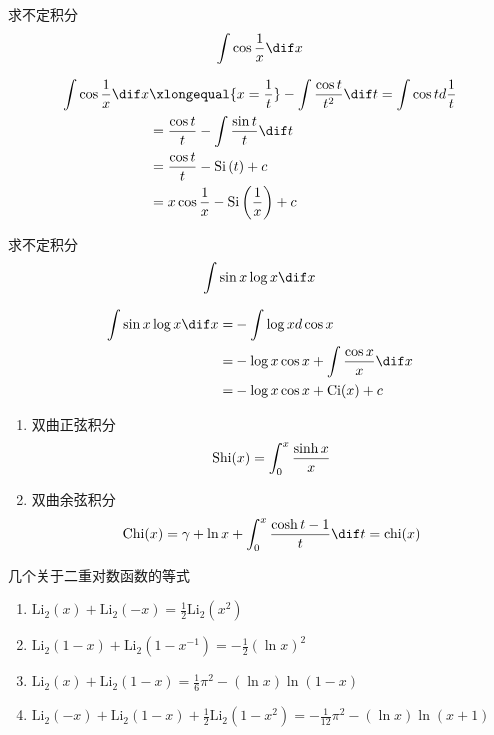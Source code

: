 \documentclass[color=green,titlestyle=hang]{elegantbook}%
\begin{document}
\begin{exercise}求不定积分\[\int {\cos \frac{1}{x}} \dif x\]
\end{exercise}\begin{Solution}\begin{align*}
\int {\cos \frac{1}{x}} \dif x &\xlongequal{x=\frac{1}{t}}- \int {\frac{{\cos t}}{{{t^2}}}} \dif t= \int {\cos t} d\frac{1}{t}\\
&=\frac{{\cos t}}{t} - \int {\frac{{\sin t}}{t}} \dif t\\
& =\frac{{\cos t}}{t} - \mathrm{Si}\left( t \right) + c\\
&= x\cos \frac{1}{x} - \mathrm{Si}\left( {\frac{1}{x}} \right) + c
\end{align*}
\end{Solution}

\begin{exercise}求不定积分\[\int\sin x\log x\dif x\]
\end{exercise}\begin{Solution}\begin{align*}\int\sin x\log x\dif x=&-\int\log xd\cos x\\
=&-\log x\cos x+\int\frac{\cos x}{x}\dif x\\
=&-\log x\cos x+\textrm{Ci}(x)+c
\end{align*}
\end{Solution}

\begin{newdef}[双曲积分函数]
\begin{enumerate}
	\item 双曲正弦积分\[{\rm Shi}(x)=\int_0^x\frac{\sinh x}{x}\]
	\item 双曲余弦积分\[{\rm Chi}(x)=\gamma+\ln x+\int_0^x\frac{\cosh t-1}{t}\dif t={\rm chi}(x)\]
\end{enumerate}	
\end{newdef}

\begin{newthem}几个关于二重对数函数的等式
\begin{enumerate}[label={(\arabic*)}]
\item $\textrm{Li}_{2}(x)+\textrm{Li}_{2}(-x)=\frac{1}{2}\textrm{Li}_{2}(x^2)$
\item $\textrm{Li}_{2}(1-x)+\textrm{Li}_{2}(1-x^{-1})=-\frac{1}{2}(\ln x)^2$
\item $\textrm{Li}_{2}(x)+\textrm{Li}_{2}(1-x)=\frac{1}{6}{\pi}^2-(\ln x)\ln(1-x)$
\item $\textrm{Li}_{2}(-x)+\textrm{Li}_{2}(1-x)+\frac{1}{2}\textrm{Li}_{2}(1-x^2)=-\frac{1}{12}{\pi}^2-(\ln x){\ln(x+1)}$			
\end{enumerate}	
\end{newthem}
\end{document}
